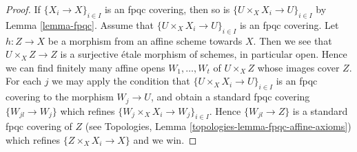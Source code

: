 \documentclass{stacks-project}
\theoremstyle{plain}
\theoremstyle{definition}
\theoremstyle{remark}
\numberwithin{equation}{subsection}
\begin{document}
\begin{proof}
If $\{X_i \to X\}_{i \in I}$ is an fpqc covering, then so is
$\{U \times_X X_i \to U\}_{i \in I}$ by Lemma \ref{lemma-fpqc}.
Assume that $\{U \times_X X_i \to U\}_{i \in I}$ is an fpqc covering.
Let $h : Z \to X$ be a morphism from an affine scheme towards $X$.
Then we see that $U \times_X Z \to Z$ is a surjective \'etale morphism
of schemes, in particular open. Hence we can find finitely many affine opens
$W_1, \ldots, W_t$ of $U \times_X Z$ whose images cover $Z$.
For each $j$ we may apply the condition that
$\{U \times_X X_i \to U\}_{i \in I}$ is an fpqc covering
to the morphism $W_j \to U$, and obtain a standard fpqc covering
$\{W_{jl} \to W_j\}$ which refines $\{W_j \times_X X_i \to W_j\}_{i \in I}$.
Hence $\{W_{jl} \to Z\}$ is a standard fpqc covering of $Z$
(see
Topologies, Lemma \ref{topologies-lemma-fpqc-affine-axioms})
which refines $\{Z \times_X X_i \to X\}$ and we win.
\end{proof}
\end{document}
